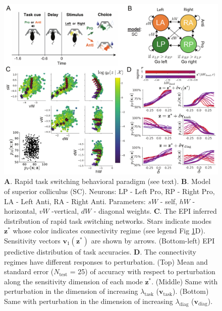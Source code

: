 \documentclass[11pt]{article}
\begin{document}
\begin{figure}
\begin{center}
\includegraphics[scale=0.8]{figures/fig4/fig4.pdf}
\end{center}
\caption{ 
\textbf{A}. Rapid task switching behavioral paradigm (see text). 
\textbf{B}. Model of superior colliculus (SC). Neurons: LP - Left Pro, RP - Right Pro, LA - Left Anti, RA - Right Anti. 
Parameters: $sW$ - self, $hW$ - horizontal, $vW$ -vertical, $dW$ - diagonal weights.  
\textbf{C}. The EPI inferred distribution of rapid task switching networks.  
Stars indicate modes $\mathbf{z}^*$ whose color indicates connectivity regime (see legend Fig \ref{fig:SC}D).
Sensitivity vectors $\mathbf{v}_1(\mathbf{z}^*)$ are shown by arrows.
(Bottom-left) EPI predictive distribution of task accuracies.
\textbf{D}. The connectivity regimes have different responses to perturbation.
(Top) Mean and standard error ($N_{\text{test}}$ = 25) of accuracy with respect to perturbation along the sensitivity dimension of each mode $\mathbf{z}^*$.
(Middle) Same with perturbation in the dimension of increasing $\lambda_{\text{task}}$ ($\mathbf{v}_{\text{task}}$).
(Bottom) Same with perturbation in the dimension of increasing $\lambda_{\text{diag}}$ ($\mathbf{v}_{\text{diag}}$).
}
\label{fig:SC}
\end{figure}
\end{document}
